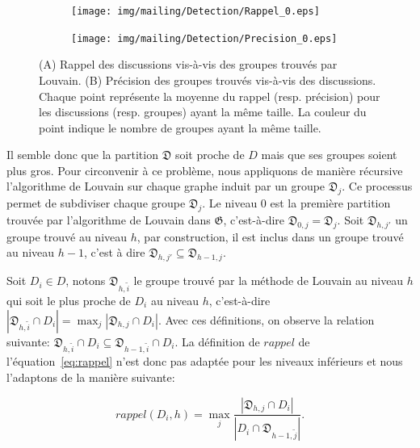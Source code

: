 \begin{figure}
\centering

\hfill
	\begin{subfigure}{0.4\textwidth}
		\texttt{[image: img/mailing/Detection/Rappel\_0.eps]}
		\caption{}		
	\end{subfigure}\hfill
	\begin{subfigure}{0.4\textwidth}
		\texttt{[image: img/mailing/Detection/Precision\_0.eps]}
		\caption{}		
	\end{subfigure}\hfill

\caption{(A) Rappel des discussions vis-à-vis des groupes trouvés par Louvain.
 (B) Précision des groupes trouvés vis-à-vis des discussions.
Chaque point représente la moyenne du rappel (resp. précision) pour les discussions (resp. groupes) ayant la même taille.
La couleur du point indique le nombre de groupes ayant la même taille.}
\label{fig:rec_inclusion_niveau0}
\end{figure}


Il semble donc que la partition $\mathfrak{D}$ soit proche de $D$ mais que ses groupes soient plus gros.
Pour circonvenir à ce problème, nous appliquons de manière récursive l'algorithme de Louvain sur chaque graphe induit par un groupe $\mathfrak{D}_j$.
Ce processus permet de subdiviser chaque groupe $\mathfrak{D}_j$.
Le niveau $0$ est la première partition trouvée par l'algorithme de Louvain dans $\mathfrak{G}$, c'est-à-dire $\mathfrak{D}_{0,j}=\mathfrak{D}_j$.
Soit $\mathfrak{D}_{h,j'}$ un groupe trouvé au niveau $h$, par construction, il est inclus dans un groupe trouvé au niveau $h-1$, c'est à dire $\mathfrak{D}_{h,j'} \subseteq \mathfrak{D}_{h-1,j}$.


Soit $D_i \in D$, notons $\mathfrak{D}_{h,\tilde{i}}$ le groupe trouvé par la méthode de Louvain au niveau $h$ qui soit le plus proche de $D_i$ au niveau $h$, c'est-à-dire $|\mathfrak{D}_{h,\tilde{i}}\cap D_i|= \max_{j} |\mathfrak{D}_{h,j} \cap D_i|$.
Avec ces définitions, on observe la relation suivante: $\mathfrak{D}_{h,\tilde{i}}\cap D_i \subseteq \mathfrak{D}_{h-1,\tilde{i}}\cap D_i$.
La définition de $rappel$ de l'équation~\ref{eq:rappel} n'est donc pas adaptée pour les niveaux inférieurs et nous l'adaptons de la manière suivante:

\begin{equation}
rappel(D_i,h)= \max_{j} \frac{|\mathfrak{D}_{h,j} \cap D_i|}{|D_i \cap \mathfrak{D}_{h-1,\tilde{j}}|}.
\end{equation}

